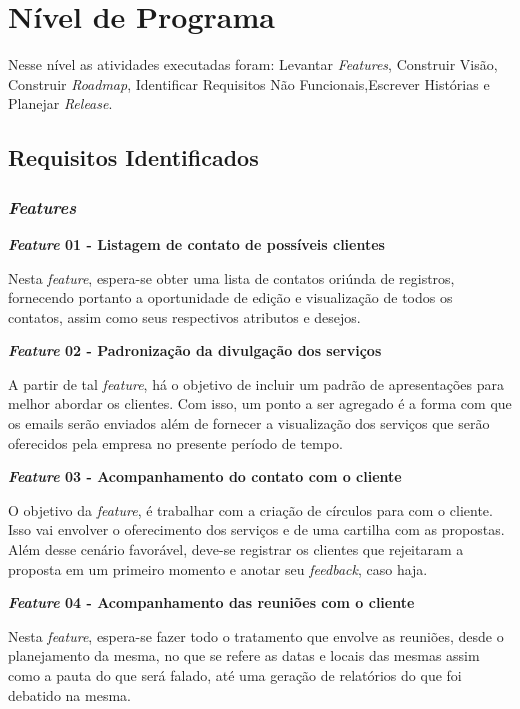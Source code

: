 \chapter[Nível de Programa]{Nível de Programa}
Nesse nível as atividades executadas foram: Levantar \textit{Features},
Construir Visão, Construir \textit{Roadmap}, Identificar Requisitos Não Funcionais,Escrever
Histórias e Planejar \textit{Release}. 

\section{Requisitos Identificados}

\subsection{\textit{Features}}
\textbf{\textit{Feature} 01 - Listagem de contato de possíveis clientes}

Nesta \textit{feature}, espera-se obter uma lista de contatos oriúnda de registros, fornecendo portanto a oportunidade de edição e visualização de todos os contatos, assim como seus respectivos atributos e desejos.


\textbf{\textit{Feature} 02 - Padronização da divulgação dos serviços}

A partir de tal \textit{feature}, há o objetivo de incluir um padrão de apresentações para melhor abordar os clientes. Com isso, um ponto a ser agregado é a forma com que os emails serão enviados além de fornecer a visualização dos serviços que serão oferecidos pela empresa no presente período de tempo.


\textbf{\textit{Feature} 03 - Acompanhamento do contato com o cliente}

O objetivo da \textit{feature}, é trabalhar com a criação de círculos para com o cliente. Isso vai envolver o oferecimento dos serviços e de uma cartilha com as propostas. Além desse cenário favorável, deve-se registrar os clientes que rejeitaram a proposta em um primeiro momento e anotar seu \textit{feedback}, caso haja.


\textbf{\textit{Feature} 04 - Acompanhamento das reuniões com o cliente}

Nesta \textit{feature}, espera-se fazer todo o tratamento que envolve as reuniões, desde o planejamento da mesma, no que se refere as datas e locais das mesmas assim como a pauta do que será falado, até uma geração de relatórios do que foi debatido na mesma.		


